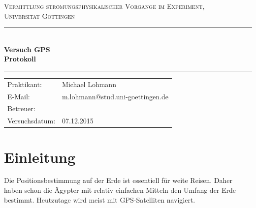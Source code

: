 \documentclass[12pt,a4paper,titlepage,headinclude,bibtotoc]{scrartcl}
\begin{document}
\begin{titlepage}
\centering
\textsc{\Large Vermittlung strömungsphysikalischer Vorgänge im Experiment,
\\[1.5ex] Universität Göttingen}

\vspace*{3cm}

\rule{\textwidth}{1pt}\\[0.5cm]
{\huge \bfseries
  Versuch GPS  \\[1.5ex]
  Protokoll}\\[0.5cm]
\rule{\textwidth}{1pt}

\vspace*{3cm}

\begin{Large}
\begin{tabular}{ll}
Praktikant: &  Michael Lohmann\\
 E-Mail: & m.lohmann@stud.uni-goettingen.de\\
 Betreuer: & \\
 Versuchsdatum: & 07.12.2015\\
\end{tabular}
\end{Large}

\vspace*{0.8cm}

\begin{Large}
\end{Large}

\end{titlepage}

\tableofcontents

\newpage

\section{Einleitung}
\label{sec:einleitung}
Die Positionsbestimmung auf der Erde ist essentiell für weite Reisen.
Daher haben schon die Ägypter mit relativ einfachen Mitteln den Umfang der Erde bestimmt.
Heutzutage wird meist mit GPS-Satelliten navigiert.
\end{document}
